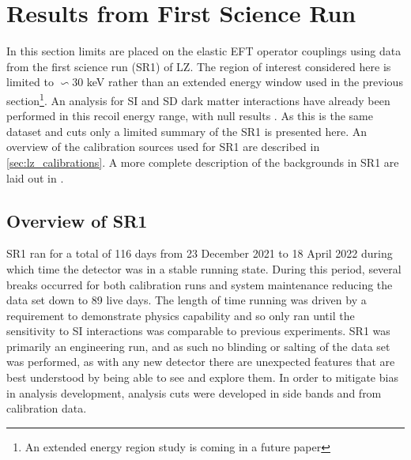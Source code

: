 \section{Results from First Science Run}
\par
In this section limits are placed on the elastic EFT operator couplings using data from the first science run (SR1) of LZ.
The region of interest considered here is limited to $\backsim$30 keV rather than an extended energy window used in the previous section\footnote{An extended energy region study is coming in a future paper}.
An analysis for SI and SD dark matter interactions have already been performed in this recoil energy range, with null results \cite{lz_ws_sr1_ref}.
As this is the same dataset and cuts only a limited summary of the SR1 is presented here.
An overview of the calibration sources used for SR1 are described in \autoref{sec:lz_calibrations}.
A more complete description of the backgrounds in SR1 are laid out in \cite{lz_sr1_backgrounds_ref}.

\subsection{Overview of SR1}
\par
SR1 ran for a total of 116 days from 23 December 2021 to 18 April 2022 during which time the detector was in a stable running state.
During this period, several breaks occurred for both calibration runs and system maintenance reducing the data set down to 89 live days.
The length of time running was driven by a requirement to demonstrate physics capability and so only ran until the sensitivity to SI interactions was comparable to previous experiments.
SR1 was primarily an engineering run, and as such no blinding or salting of the data set was performed, as with any new detector there are unexpected features that are best understood by being able to see and explore them.
In order to mitigate bias in analysis development, analysis cuts were developed in side bands and from calibration data.

